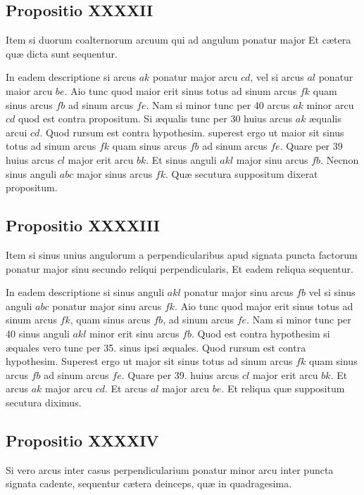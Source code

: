 \documentclass[11pt,a4paper]{article}
\begin{document}
\subsection*{Propositio XXXXII}

Item si duorum coalternorum arcuum qui ad angulum ponatur major Et cætera quæ dicta sunt sequentur.

In eadem descriptione si arcus $ak$ ponatur major arcu $cd$, vel si arcus $al$ ponatur maior arcu $be$. Aio tunc quod maior erit sinus totus ad sinum arcus $fk$ quam sinus arcus $fb$ ad sinum arcus $fe$. Nam si minor tunc per 40 arcus $ak$ minor arcu $cd$ quod est contra propositum. Si æqualis tunc per 30 huius arcus $ak$ æqualis arcui $cd$. Quod rursum est contra hypothesim. superest ergo ut maior sit sinus totus ad sinum arcus $fk$ quam sinus arcus $fb$ ad sinum arcus $fe$. Quare per 39 huius arcus $cl$ major erit arcu $bk$. Et sinus anguli $akl$ major sinu arcus $fb$. Necnon sinus anguli $abc$ major sinus arcus $fk$. Quæ secutura suppositum dixerat propositum.

\subsection*{Propositio XXXXIII}

Item si sinus unius angulorum a perpendicularibus apud signata puncta factorum ponatur major sinu secundo reliqui perpendicularis, Et eadem reliqua sequentur.

In eadem descriptione si sinus anguli $akl$ ponatur major sinu arcus $fb$ vel si sinus anguli $abc$ ponatur major sinu arcus $fk$. Aio tunc quod major erit sinus totus ad sinum arcus $fk$, quam sinus arcus $fb$, ad sinum arcus $fe$. Nam si minor tunc per 40 sinus anguli $akl$ minor erit sinu arcus $fb$. Quod est contra hypothesim si æquales vero tunc per 35. sinus ipsi æquales. Quod rursum est contra hypothesim. Superest ergo ut major sit sinus totus ad sinum arcus $fk$ quam sinus arcus $fb$ ad sinum arcus $fe$. Quare per 39. huius arcus $cl$ major erit arcu $bk$. Et arcus $ak$ major arcu $cd$. Et arcus $al$ major arcu $be$. Et reliqua quæ suppositum secutura diximus.

\subsection*{Propositio XXXXIV}

Si vero arcus inter casus perpendicularium ponatur minor arcu inter puncta signata cadente, sequentur cætera deinceps, quæ in quadragesima.
\end{document}
